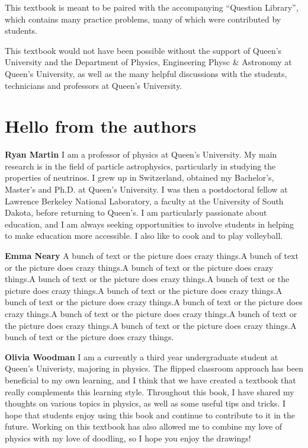 This textbook is meant to be paired with the accompanying ``Question Library'', which contains many practice problems, many of which were contributed by students. 

This textbook would not have been possible without the support of Queen's University and the Department of Physics, Engineering Physc \& Astronomy at Queen's University, as well as the many helpful discussions with the students, technicians and professors at Queen's University.

\section*{Hello from the authors}
\textbf{Ryan Martin} I am a professor of physics at Queen's University. My main research is in the field of particle astrophysics, particularly in studying the properties of neutrinos. I grew up in Switzerland, obtained my Bachelor's, Master's and Ph.D. at Queen's University. I was then a postdoctoral fellow at Lawrence Berkeley National Laboratory, a faculty at the University of South Dakota, before returning to Queen's. I am particularly passionate about education, and I am always seeking opportunities to involve students in helping to make education more accessible. I also like to cook and to play volleyball.

\textbf{Emma Neary} A bunch of text or the picture does crazy things.A bunch of text or the picture does crazy things.A bunch of text or the picture does crazy things.A bunch of text or the picture does crazy things.A bunch of text or the picture does crazy things.A bunch of text or the picture does crazy things.A bunch of text or the picture does crazy things.A bunch of text or the picture does crazy things.A bunch of text or the picture does crazy things.A bunch of text or the picture does crazy things.A bunch of text or the picture does crazy things.A bunch of text or the picture does crazy things.

\textbf{Olivia Woodman} I am a currently a third year undergraduate student at Queen's Univeristy, majoring in physics. The flipped classroom approach has been beneficial to my own learning, and I think that we have created a textbook that really complements this learning style. Throughout this book, I have shared my thoughts on various topics in physics, as well as some useful tips and tricks. I hope that students enjoy using this book and continue to contribute to it in the future. Working on this textbook has also allowed me to combine my love of physics with my love of doodling, so I hope you enjoy the drawings!

